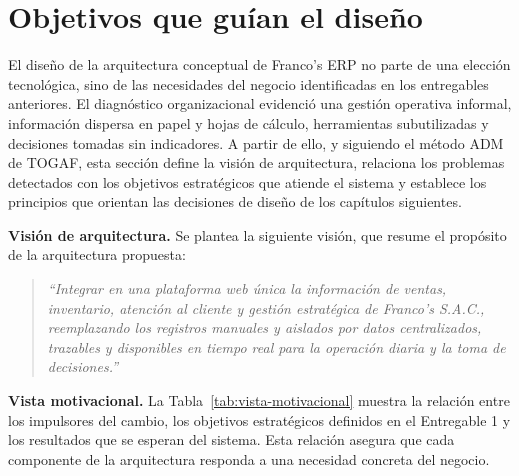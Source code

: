 \section{Objetivos que guían el diseño}

El diseño de la arquitectura conceptual de Franco's ERP no parte de una elección tecnológica, sino de las necesidades del negocio identificadas en los entregables anteriores. El diagnóstico organizacional evidenció una gestión operativa informal, información dispersa en papel y hojas de cálculo, herramientas subutilizadas y decisiones tomadas sin indicadores. A partir de ello, y siguiendo el método ADM de TOGAF, esta sección define la visión de arquitectura, relaciona los problemas detectados con los objetivos estratégicos que atiende el sistema y establece los principios que orientan las decisiones de diseño de los capítulos siguientes.

\textbf{Visión de arquitectura.} Se plantea la siguiente visión, que resume el propósito de la arquitectura propuesta:

\begin{quote}
\textit{``Integrar en una plataforma web única la información de ventas, inventario, atención al cliente y gestión estratégica de Franco's S.A.C., reemplazando los registros manuales y aislados por datos centralizados, trazables y disponibles en tiempo real para la operación diaria y la toma de decisiones.''}
\end{quote}

\textbf{Vista motivacional.} La Tabla~\ref{tab:vista-motivacional} muestra la relación entre los impulsores del cambio, los objetivos estratégicos definidos en el Entregable 1 y los resultados que se esperan del sistema. Esta relación asegura que cada componente de la arquitectura responda a una necesidad concreta del negocio.

